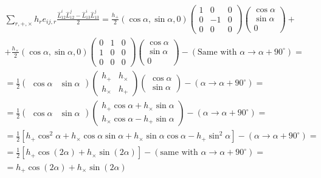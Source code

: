 \documentclass[../template.tex]{subfiles}
\begin{document}
\begin{align*}
    \sum_{r, + , \times} h_r e_{ij,r} \frac{\hat{L}_{12}^i \hat{L}_{12}^j - \hat{L}_{13}^i \hat{L}_{13}^j}{2} = \frac{h_+}{2} (\cos \alpha, \sin \alpha, 0) \left(\begin{array}{ccc}
    1 & 0 & 0 \\ 
    0 & -1 & 0 \\ 
    0 & 0 & 0
    \end{array}\right)  \left(\begin{array}{c}
    \cos \alpha \\ 
    \sin \alpha \\ 
    0
    \end{array}\right) +\\
    + \frac{h_\times}{2} (\cos \alpha, \sin \alpha, 0) \left(\begin{array}{ccc}
    0 & 1 & 0 \\ 
    1 & 0 & 0 \\ 
    0 & 0 & 0
    \end{array}\right) \left(\begin{array}{c}
    \cos \alpha \\ 
    \sin \alpha \\ 
    0
    \end{array}\right) - (\text{Same with $\alpha \to \alpha + 90^\circ$}) =\\
    =\frac{1}{2} \left(\begin{array}{cc}
    \cos \alpha & \sin \alpha 
    \end{array}\right) \left(\begin{array}{cc}
    h_+ & h_\times \\ 
    h_\times & h_+
    \end{array}\right) \left(\begin{array}{c}
    \cos \alpha \\ 
    \sin \alpha
    \end{array}\right) - (\alpha \to \alpha + 90^\circ) =\\
    = \frac{1}{2} \left(\begin{array}{cc}
    \cos \alpha & \sin \alpha
    \end{array}\right) \left(\begin{array}{c}
    h_+ \cos \alpha + h_\times \sin \alpha \\ 
    h_\times \cos \alpha - h_+ \sin \alpha
    \end{array}\right) - (\alpha \to \alpha + 90^\circ) =\\
    = \frac{1}{2} [h_+ \cos^2 \alpha + h_\times \cos \alpha \sin \alpha + h_\times \sin \alpha \cos \alpha - h_+ \sin^2 \alpha] - (\alpha \to \alpha+ 90^\circ   ) =\\
    = \frac{1}{2}[h_+ \cos(2 \alpha) + h_\times \sin(2 \alpha)] - (\text{same with } \alpha \to \alpha +90^\circ) =\\
    = h_+ \cos(2 \alpha) + h_\times \sin (2 \alpha) 
\end{align*}
\end{document}
